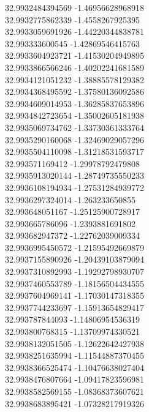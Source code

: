 {32.9932484394569	-1.46956628968918\\
32.9932775862339	-1.4558267925395\\
32.9933059691926	-1.44220344838781\\
32.993333600545	-1.42869546415763\\
32.9933604923721	-1.41530204949895\\
32.9933866566246	-1.40202241681589\\
32.9934121051232	-1.38885578129382\\
32.9934368495592	-1.37580136092586\\
32.9934609014953	-1.36285837653896\\
32.9934842723654	-1.35002605181938\\
32.9935069734762	-1.33730361333764\\
32.9935290160068	-1.32469029057296\\
32.9935504110098	-1.31218531593717\\
32.993571169412	-1.29978792479808\\
32.9935913020144	-1.28749735550233\\
32.9936108194934	-1.27531284939772\\
32.9936297324014	-1.263233650855\\
32.993648051167	-1.25125900728917\\
32.993665786096	-1.2393881691802\\
32.993682947372	-1.22762039009334\\
32.9936995450572	-1.21595492669879\\
32.9937155890926	-1.20439103879094\\
32.9937310892993	-1.19292798930707\\
32.9937460553789	-1.18156504434555\\
32.9937604969141	-1.17030147318355\\
32.9937744233697	-1.15913654829417\\
32.993787844093	-1.14806954536319\\
32.993800768315	-1.13709974330521\\
32.9938132051505	-1.12622642427938\\
32.9938251635994	-1.11544887370455\\
32.9938366525474	-1.10476638027404\\
32.9938476807664	-1.09417823596981\\
32.9938582569155	-1.08368373607621\\
32.9938683895421	-1.07328217919326\\
}
